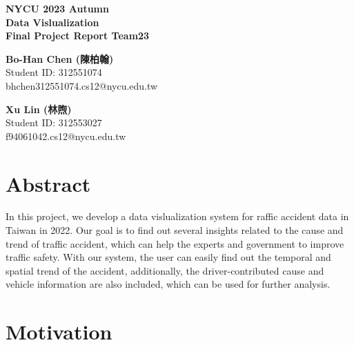 \documentclass[a4paper, oneside, final, 12pt]{scrartcl} %
\begin{document}


\begin{center}
    {\fontsize{18}{30}\textbf{NYCU 2023 Autumn \\ Data Vislualization \\ Final Project Report Team23}} \\
\end{center}

  \begin{minipage}[t]{0.45\textwidth}
    \begin{center}
      \textbf{Bo-Han Chen (陳柏翰)} \\
      Student ID: 312551074 \\
      bhchen312551074.cs12@nycu.edu.tw
    \end{center}
  \end{minipage}
  \begin{minipage}[t]{0.45\textwidth}
    \begin{center}
      \textbf{Xu Lin (林煦)} \\
      Student ID: 312553027 \\
      f94061042.cs12@nycu.edu.tw
    \end{center}
  \end{minipage}

\section{Abstract}

  In this project, we develop a data vislualization system for
  raffic accident data in Taiwan in 2022.
  Our goal is to find out several insights
  related to the cause and trend of traffic accident,
  which can help the experts and government to improve traffic safety.
  With our system, the user can easily find out the temporal and spatial trend of the accident,
  additionally, the driver-contributed cause and vehicle information 
  are also included, which can be used for further analysis.

\section{Motivation}
\end{document}
